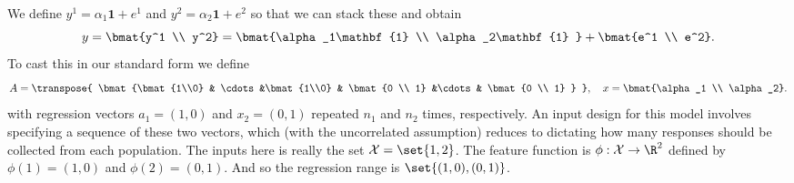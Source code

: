 We define $y^1 = \alpha _1\mathbf{1}  + e^1$ and $y^2 = \alpha _2\mathbf{1}  + e^2$ so that we can stack these and obtain
\[
y = \bmat{y^1 \\ y^2} = \bmat{\alpha _1\mathbf{1}  \\ \alpha _2\mathbf{1} } + \bmat{e^1 \\ e^2}.
\]
To cast this in our standard form we define
\[
A = \transpose{
\bmat{\bmat{1\\0} & \cdots &\bmat{1\\0} & \bmat{0 \\ 1} &\cdots & \bmat{0 \\ 1}
}
}, \quad x = \bmat{\alpha _1 \\ \alpha _2}.
\]
with regression vectors $a_1 = (1, 0)$ and $x_2 = (0, 1)$ repeated $n_1$ and $n_2$ times, respectively.
An input design for this model involves specifying a sequence of these two vectors, which (with the uncorrelated assumption) reduces to dictating how many responses should be collected from each population.
The inputs here is really the set $\mathcal{X}  = \set{1, 2}$.
The feature function is $\phi : \mathcal{X}  \to \R ^2$ defined by $\phi (1) = (1, 0)$ and $\phi (2) = (0, 1)$.
And so the regression range is $\set{(1, 0), (0, 1)}$.
